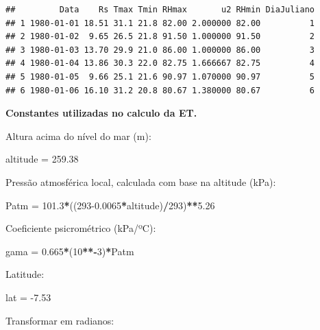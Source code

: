 \documentclass[
]{book}
\newenvironment{Shaded}{\begin{snugshade}}{\end{snugshade}}
\newcommand{\DecValTok}[1]{\textcolor[rgb]{0.00,0.00,0.81}{#1}}
\newcommand{\FloatTok}[1]{\textcolor[rgb]{0.00,0.00,0.81}{#1}}
\newcommand{\NormalTok}[1]{#1}
\newcommand{\OperatorTok}[1]{\textcolor[rgb]{0.81,0.36,0.00}{\textbf{#1}}}
\newcommand{\StringTok}[1]{\textcolor[rgb]{0.31,0.60,0.02}{#1}}
\begin{document}
\begin{verbatim}
##         Data    Rs Tmax Tmin RHmax       u2 RHmin DiaJuliano
## 1 1980-01-01 18.51 31.1 21.8 82.00 2.000000 82.00          1
## 2 1980-01-02  9.65 26.5 21.8 91.50 1.000000 91.50          2
## 3 1980-01-03 13.70 29.9 21.0 86.00 1.000000 86.00          3
## 4 1980-01-04 13.86 30.3 22.0 82.75 1.666667 82.75          4
## 5 1980-01-05  9.66 25.1 21.6 90.97 1.070000 90.97          5
## 6 1980-01-06 16.10 31.2 20.8 80.67 1.380000 80.67          6
\end{verbatim}

\textbf{Constantes utilizadas no calculo da ET.}

Altura acima do nível do mar (m):

\begin{Shaded}
\begin{Highlighting}[]
\NormalTok{altitude =}\StringTok{ }\FloatTok{259.38} 
\end{Highlighting}
\end{Shaded}

Pressão atmosférica local, calculada com base na altitude (kPa):

\begin{Shaded}
\begin{Highlighting}[]
\NormalTok{Patm =}\StringTok{ }\FloatTok{101.3}\OperatorTok{*}\NormalTok{((}\DecValTok{293}\FloatTok{-0.0065}\OperatorTok{*}\NormalTok{altitude)}\OperatorTok{/}\DecValTok{293}\NormalTok{)}\OperatorTok{**}\FloatTok{5.26} 
\end{Highlighting}
\end{Shaded}

Coeficiente psicrométrico (kPa/ºC):

\begin{Shaded}
\begin{Highlighting}[]
\NormalTok{gama =}\StringTok{ }\FloatTok{0.665}\OperatorTok{*}\NormalTok{(}\DecValTok{10}\OperatorTok{**-}\DecValTok{3}\NormalTok{)}\OperatorTok{*}\NormalTok{Patm }
\end{Highlighting}
\end{Shaded}

Latitude:

\begin{Shaded}
\begin{Highlighting}[]
\NormalTok{lat =}\StringTok{ }\FloatTok{-7.53}  
\end{Highlighting}
\end{Shaded}

Transformar em radianos:
\end{document}
